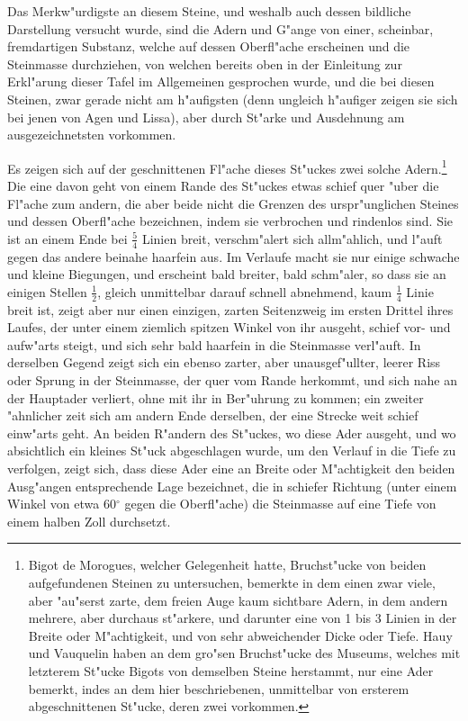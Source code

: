 \documentclass[a4paper, 11pt, oneside, german]{article}
\begin{document}
Das Merkw"urdigste an diesem Steine, und weshalb auch dessen bildliche Darstellung versucht wurde, sind die Adern und G"ange von einer, scheinbar, fremdartigen Substanz, welche auf dessen Oberfl"ache erscheinen und die Steinmasse durchziehen, von welchen bereits oben in der Einleitung zur Erkl"arung dieser Tafel im Allgemeinen gesprochen wurde, und die bei diesen Steinen, zwar gerade nicht am h"aufigsten (denn ungleich h"aufiger zeigen sie sich bei jenen von Agen und Lissa), aber durch St"arke und Ausdehnung am ausgezeichnetsten vorkommen.

Es zeigen sich auf der geschnittenen Fl"ache dieses St"uckes zwei solche Adern.\footnote{Bigot de Morogues, welcher Gelegenheit hatte, Bruchst"ucke von beiden aufgefundenen Steinen zu untersuchen, bemerkte in dem einen zwar viele, aber "au"serst zarte, dem freien Auge kaum sichtbare Adern, in dem andern mehrere, aber durchaus st"arkere, und darunter eine von 1 bis 3 Linien in der Breite oder M"achtigkeit, und von sehr abweichender Dicke oder Tiefe. Hauy und Vauquelin haben an dem gro"sen Bruchst"ucke des Museums, welches mit letzterem St"ucke Bigots von demselben Steine herstammt, nur eine Ader bemerkt, indes an dem hier beschriebenen, unmittelbar von ersterem abgeschnittenen St"ucke, deren zwei vorkommen.} Die eine davon geht von einem Rande des St"uckes etwas schief quer "uber die Fl"ache zum andern, die aber beide nicht die Grenzen des urspr"unglichen Steines und dessen Oberfl"ache bezeichnen, indem sie verbrochen und rindenlos sind. Sie ist an einem Ende bei $\frac{5}{4}$ Linien breit, verschm"alert sich allm"ahlich, und l"auft gegen das andere beinahe haarfein aus. Im Verlaufe macht sie nur einige schwache und kleine Biegungen, und erscheint bald breiter, bald schm"aler, so dass sie an einigen Stellen $\frac{1}{2}$, gleich unmittelbar darauf schnell abnehmend, kaum $\frac{1}{4}$ Linie breit ist, zeigt aber nur einen einzigen, zarten Seitenzweig im ersten Drittel ihres Laufes, der unter einem ziemlich spitzen Winkel von ihr ausgeht, schief vor- und aufw"arts steigt, und sich sehr bald haarfein in die Steinmasse verl"auft. In derselben Gegend zeigt sich ein ebenso zarter, aber unausgef"ullter, leerer Riss oder Sprung in der Steinmasse, der quer vom Rande herkommt, und sich nahe an der Hauptader verliert, ohne mit ihr in Ber"uhrung zu kommen; ein zweiter "ahnlicher zeit sich am andern Ende derselben, der eine Strecke weit schief einw"arts geht. An beiden R"andern des St"uckes, wo diese Ader ausgeht, und wo absichtlich ein kleines St"uck abgeschlagen wurde, um den Verlauf in die Tiefe zu verfolgen, zeigt sich, dass diese Ader eine an Breite oder M"achtigkeit den beiden Ausg"angen entsprechende Lage bezeichnet, die in schiefer Richtung (unter einem Winkel von etwa 60$^{\circ}$ gegen die Oberfl"ache) die Steinmasse auf eine Tiefe von einem halben Zoll durchsetzt.
\end{document}
